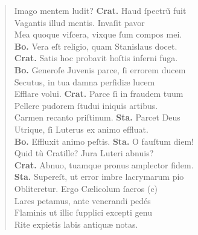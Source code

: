 \documentclass[a4paper,12pt]{article}
\begin{document}
\begin{verse}
Imago mentem ludit? \textbf{Crat.} Haud ſpectrũ fuit\\[0pt]
Vagantis illud mentis. Invaſit pavor\\[0pt]
Mea quoque viſcera, vixque ſum compos mei.\\[0pt]
\textbf{Bo.} Vera eſt religio, quam Stanislaus docet.\\[0pt]
\textbf{Crat.} Satis hoc probavit hoſtis inferni fuga.\\[0pt]
\textbf{Bo.} Generoſe Juvenis parce, ſi errorem ducem\\[0pt]
Secutus, in tua damna perfidiæ lucem\\[0pt]
Efflare volui. \textbf{Crat.} Parce ſi in fraudem tuum\\[0pt]
Pellere pudorem ſtudui iniquis artibus.\\[0pt]
Carmen recanto priſtinum. \textbf{Sta.} Parcet Deus\\[0pt]
Utrique, ſi Luterus ex animo effluat.\\[0pt]
\textbf{Bo.} Effluxit animo peſtis. \textbf{Sta.} O fauſtum diem!\\[0pt]
Quid tù Cratille? Jura Luteri abnuis?\\[0pt]
\textbf{Crat.} Abnuo, tuamque pronus amplector fidem.\\[0pt]
\textbf{Sta.} Supereſt, ut error imbre lacrymarum pio\\[0pt]
Obliteretur. Ergo Cælicolum ſacros (c)\footnotemark\\[0pt]
Lares petamus, ante venerandi pedés\\[0pt]
Flaminis ut illic ſupplici excepti genu\\[0pt]
Rite expietis labis antiquæ notas.\\[0pt]
\end{verse}
\end{document}
